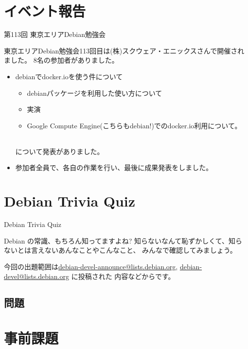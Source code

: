 \section{イベント報告}

\begin{frame}{第113回 東京エリアDebian勉強会}

 東京エリアDebian勉強会113回目は(株)スクウェア・エニックスさんで開催されました。
8名の参加者がありました。

\begin{itemize}
\item debianでdocker.ioを使う件について
  \begin{itemize}
    \item debianパッケージを利用した使い方について
    \item 実演
    \item Google Compute Engine(こちらもdebian!)でのdocker.io利用について。
　\end{itemize}
について発表がありました。
\item 参加者全員で、各自の作業を行い、最後に成果発表をしました。
\end{itemize}

\end{frame}

\section{Debian Trivia Quiz}
\begin{frame}{Debian Trivia Quiz}

  Debian の常識、もちろん知ってますよね?
知らないなんて恥ずかしくて、知らないとは言えないあんなことやこんなこと、
みんなで確認してみましょう。

今回の出題範囲は\url{debian-devel-announce@lists.debian.org},
\url{debian-devel@lists.debian.org} に投稿された
内容などからです。

\end{frame}

\subsection{問題}



\section{事前課題}
{\footnotesize
 
}

